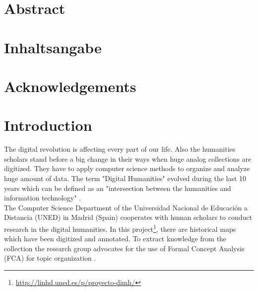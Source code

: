 \documentclass[11pt]{report}
\begin{document}


\renewcommand{\thepage}{\roman{page}}%

\newpage
\thispagestyle{empty}
\mbox{}

\chapter*{Abstract}
\blindtext

\newpage
\thispagestyle{empty}
\mbox{}

\chapter*{Inhaltsangabe}
\blindtext

\newpage
\thispagestyle{empty}
\mbox{}

\chapter*{Acknowledgements}
\blindtext

\newpage
\thispagestyle{empty}
\mbox{}

\tableofcontents
\newpage

\newpage
\thispagestyle{empty}
\mbox{}


\chapter{Introduction}

\renewcommand{\thepage}{\arabic{page}}
\setcounter{page}{1}

The digital revolution is affecting every part of our life. Also the humanities scholars stand before a big change in their ways when huge analog collections are digitized. They have to apply computer science methods to organize and analyze huge amount of data. The term "Digital Humanities" evolved during the last 10 years which can be defined as an "intersection between the humanities and information technology" \cite{Svensson2010}.\\

 The Computer Science Department of the Universidad Nacional de Educación a Distancia (UNED) in Madrid (Spain) cooperates with human scholars to conduct research in the digital humanities. In this project\footnote{\url{http://linhd.uned.es/p/proyecto-dimh/}}, there are historical maps which have been digitized and annotated. To extract knowledge from the collection the research group advocates for the use of Formal Concept Analysis (FCA) for topic organization \cite{Castellanos,Cigarran}.\\
 
\end{document}
